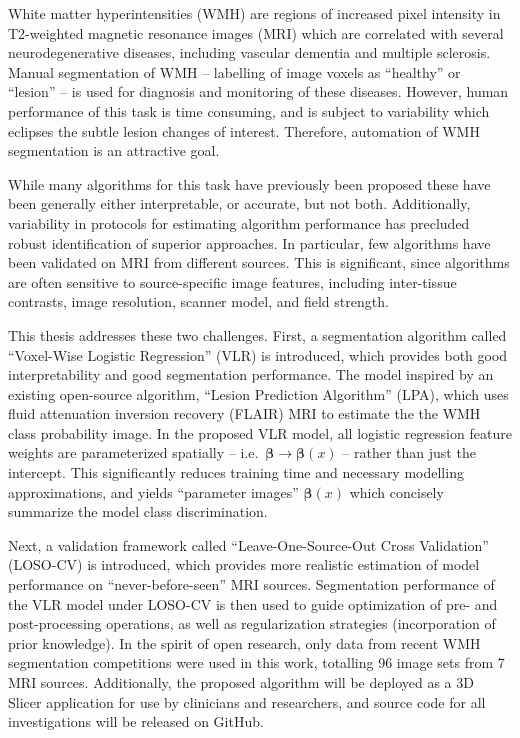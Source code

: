 White matter hyperintensities (WMH) are regions of increased pixel intensity
in T2-weighted magnetic resonance images (MRI)
which are correlated with several neurodegenerative diseases,
including vascular dementia and multiple sclerosis.
Manual segmentation of WMH -- labelling of image voxels as ``healthy'' or ``lesion'' --
is used for diagnosis and monitoring of these diseases.
However, human performance of this task is time consuming,
and is subject to variability which eclipses the subtle lesion changes of interest.
Therefore, automation of WMH segmentation is an attractive goal.
\par
While many algorithms for this task have previously been proposed
these have been generally either interpretable, or accurate, but not both.
Additionally, variability in protocols for estimating algorithm performance
has precluded robust identification of superior approaches.
In particular, few algorithms have been validated on MRI from different sources.
This is significant, since algorithms are often sensitive to
source-specific image features, including
inter-tissue contrasts, image resolution, scanner model, and field strength.
\par
This thesis addresses these two challenges.
First, a segmentation algorithm called
``Voxel-Wise Logistic Regression'' (VLR) is introduced,
which provides both good interpretability and good segmentation performance.
The model inspired by an existing open-source algorithm,
``Lesion Prediction Algorithm'' (LPA),
which uses fluid attenuation inversion recovery (FLAIR) MRI
to estimate the the WMH class probability image.
In the proposed VLR model,
all logistic regression feature weights are parameterized spatially
-- i.e.\ $\bm{\beta} \rightarrow \bm{\beta}(x)$ --
rather than just the intercept.
This significantly reduces training time and necessary modelling approximations,
and yields ``parameter images'' $\bm{\beta}(x)$
which concisely summarize the model class discrimination.
\par
Next, a validation framework called
``Leave-One-Source-Out Cross Validation'' (LOSO-CV) is introduced,
which provides more realistic estimation of model performance
on ``never-before-seen'' MRI sources.
Segmentation performance of the VLR model under LOSO-CV
is then used to guide optimization of pre- and post-processing operations,
as well as regularization strategies (incorporation of prior knowledge).
In the spirit of open research,
only data from recent WMH segmentation competitions
were used in this work, totalling 96 image sets from 7 MRI sources.
Additionally, the proposed algorithm will be deployed as a 3D Slicer application
for use by clinicians and researchers,
and source code for all investigations will be released on GitHub.
